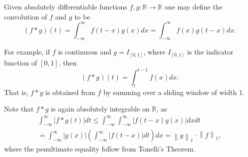 \documentclass[12pt, draft,reqno,a4paper, twoside]{amsproc}
\newcommand{\dbR}{\mathbb R}
\newcommand{\norm}[1]{\left\|#1\right\|}
\newcommand{\abs}[1]{\left|#1\right|}
\begin{document}
\begin{defi}
Given absolutely differentiable functions $f,g:\dbR\to\dbR$ one may define the convolution of $f$ and $g$ to be
\[(f\ast g)(t)=\int_{-\infty}^\infty f(t-x)g(x)dx=\int_{-\infty}^\infty f(x)g(t-x)dx.\]
\end{defi}

\begin{exam}
For example, if $f$ is continuous and $g=I_{[0,1]}$, where $I_{[0,1]}$ is the indicator function of $[0,1]$, then 
\begin{equation}\label{equation:convolution}
(f\ast g)(t)=\int_{t}^{t-1}f(x)dx.
\end{equation}That is, $f\ast g$ is obtained from $f$ by summing over a sliding window of width $1$.
\end{exam}

\begin{rem}
Note that $f\ast g$ is again absolutely integrable on $\dbR$, as
\begin{multline*}\int_{-\infty}^\infty\abs{f\ast g(t)}dt\le\int_{-\infty}^{\infty}\int_{-\infty}^{\infty}\abs{f(t-x)g(x)}dxdt\\
=\int_{-\infty}^\infty \abs{g(x)}\left(\int_{-\infty}^\infty\abs{f(t-x)}dt\right)dx=\norm{g}_1\cdot \norm{f}_1,
\end{multline*}
where the penultimate equality follow from Tonelli's Theorem.
\end{rem}
\end{document}
